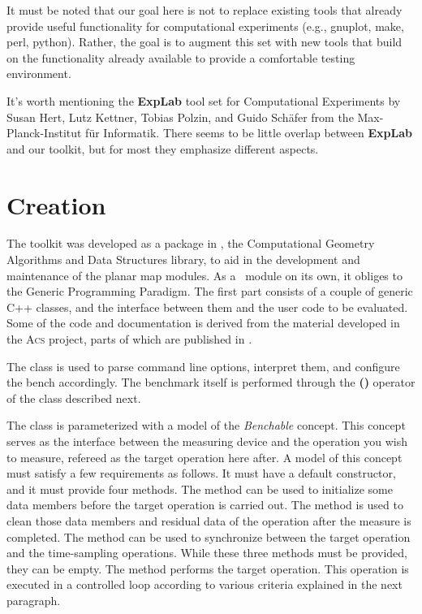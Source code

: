 It must be noted that our goal here is not to replace existing tools
that already provide useful functionality for computational
experiments (e.g., gnuplot, make, perl, python). Rather, the goal is
to augment this set with new tools that build on the functionality
already available to provide a comfortable testing environment.

It's worth mentioning the \textbf{ExpLab} tool set for Computational
Experiments by Susan Hert, Lutz Kettner, Tobias Polzin, and Guido
Sch{\"a}fer from the Max-Planck-Institut f{\"u}r Informatik. There seems to be
little overlap between \textbf{ExpLab} and our toolkit, but for most
they emphasize different aspects.

\section{Creation}

The toolkit was developed as a package in \cgal, the Computational
Geometry Algorithms and Data Structures library, to aid in the
development and maintenance of the planar map modules. As a 
\cgal\ module on its own, it obliges to the Generic Programming Paradigm. 
The first part consists of a couple of generic C++ classes, and the
interface between them and the user code to be evaluated. Some of the code 
and documentation is derived from the material developed in the 
\textsc{Acs} project, parts of which are published in \cite{cgal:f-ecsca-04}.

The  class is used to parse command line options, 
interpret them, and configure the bench accordingly. The benchmark itself 
is performed through the \textbf{()} operator of the  class 
described next.

The  class is parameterized with a model of the
{\em Benchable} concept. This concept serves as the interface between
the measuring device and the operation you wish to measure, refereed
as the target operation here after. A model of this concept must
satisfy a few requirements as follows. It must have a default
constructor, and it must provide four methods. The
 method can be used to initialize some data
members before the target operation is carried out. The
 method is used to clean those data members
and residual data of the operation after the measure is completed. The
 method can be used to synchronize between the
target operation and the time-sampling operations. While these three
methods must be provided, they can be empty. The 
method performs the target operation. This operation is executed in a
controlled loop according to various criteria explained in the next
paragraph.

